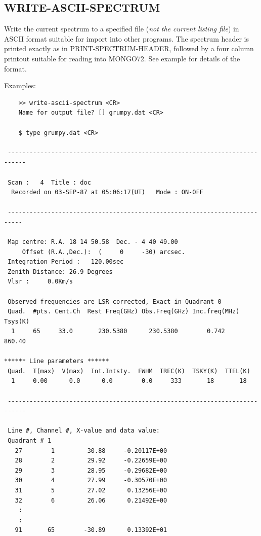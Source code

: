 \documentclass[11pt,twoside]{report}
\begin{document}
\subsection{WRITE-ASCII-SPECTRUM} 

Write the current spectrum to a specified file ({\em not the current listing
file}) in ASCII format suitable for import into other programs. The spectrum
header is printed exactly as in PRINT-SPECTRUM-HEADER, followed by a four
column printout suitable for reading into MONGO72. See example for details of
the format.

Examples:
\begin{verbatim}
    >> write-ascii-spectrum <CR>
    Name for output file? [] grumpy.dat <CR>

    $ type grumpy.dat <CR>

 ---------------------------------------------------------------------------

 Scan :   4  Title : doc                       
  Recorded on 03-SEP-87 at 05:06:17(UT)   Mode : ON-OFF

 --------------------------------------------------------------------------

 Map centre: R.A. 18 14 50.58  Dec. - 4 40 49.00
     Offset (R.A.,Dec.):  (     0     -30) arcsec.
 Integration Period :   120.00sec
 Zenith Distance: 26.9 Degrees
 Vlsr :     0.0Km/s

 Observed frequencies are LSR corrected, Exact in Quadrant 0
 Quad.  #pts. Cent.Ch  Rest Freq(GHz) Obs.Freq(GHz) Inc.freq(MHz) Tsys(K)
  1     65     33.0       230.5380      230.5380        0.742    860.40    

****** Line parameters ******
 Quad.  T(max)  V(max)  Int.Intsty.  FWHM  TREC(K)  TSKY(K)  TTEL(K)
  1     0.00      0.0      0.0        0.0     333       18       18

 ---------------------------------------------------------------------------

 Line #, Channel #, X-value and data value:
 Quadrant # 1
   27        1         30.88     -0.20117E+00
   28        2         29.92     -0.22659E+00
   29        3         28.95     -0.29682E+00
   30        4         27.99     -0.30570E+00
   31        5         27.02      0.13256E+00
   32        6         26.06      0.21492E+00
    :
    :
   91       65        -30.89      0.13392E+01

\end{verbatim}
\end{document}
